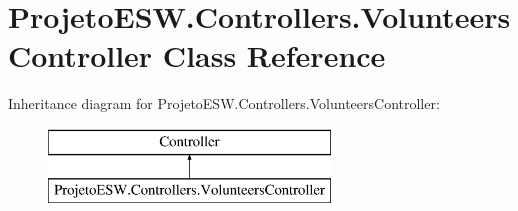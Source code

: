 \hypertarget{class_projeto_e_s_w_1_1_controllers_1_1_volunteers_controller}{}\section{Projeto\+E\+S\+W.\+Controllers.\+Volunteers\+Controller Class Reference}
\label{class_projeto_e_s_w_1_1_controllers_1_1_volunteers_controller}
Inheritance diagram for Projeto\+E\+S\+W.\+Controllers.\+Volunteers\+Controller\+:\begin{figure}[H]
\begin{center}
\leavevmode
\includegraphics[height=2.000000cm]{class_projeto_e_s_w_1_1_controllers_1_1_volunteers_controller}
\end{center}
\end{figure}
